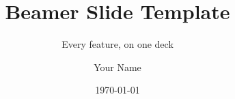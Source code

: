\title[Showcase]{Beamer Slide Template}
\subtitle{Every feature, on one deck}

\author[Your Name]{Your Name}


\date{\today}
